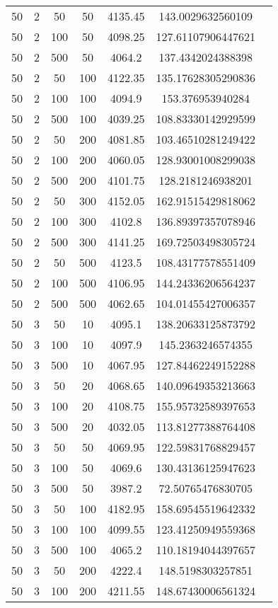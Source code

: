 {\begin{longtabu}{S
S
S
S
S
S[round-mode=places,round-precision=0]
S[round-mode=places,round-precision=0]}
50 & 2 & 50 & 50 & 4135.45 & 143.0029632560109 \\
50 & 2 & 100 & 50 & 4098.25 & 127.61107906447621 \\
50 & 2 & 500 & 50 & 4064.2 & 137.4342024388398 \\
50 & 2 & 50 & 100 & 4122.35 & 135.17628305290836 \\
50 & 2 & 100 & 100 & 4094.9 & 153.376953940284 \\
50 & 2 & 500 & 100 & 4039.25 & 108.83330142929599 \\
50 & 2 & 50 & 200 & 4081.85 & 103.46510281249422 \\
50 & 2 & 100 & 200 & 4060.05 & 128.93001008299038 \\
50 & 2 & 500 & 200 & 4101.75 & 128.2181246938201 \\
50 & 2 & 50 & 300 & 4152.05 & 162.91515429818062 \\
50 & 2 & 100 & 300 & 4102.8 & 136.89397357078946 \\
50 & 2 & 500 & 300 & 4141.25 & 169.72503498305724 \\
50 & 2 & 50 & 500 & 4123.5 & 108.43177578551409 \\
50 & 2 & 100 & 500 & 4106.95 & 144.24336206564237 \\
50 & 2 & 500 & 500 & 4062.65 & 104.01455427006357 \\
50 & 3 & 50 & 10 & 4095.1 & 138.20633125873792 \\
50 & 3 & 100 & 10 & 4097.9 & 145.2363246574355 \\
50 & 3 & 500 & 10 & 4067.95 & 127.84462249152288 \\
50 & 3 & 50 & 20 & 4068.65 & 140.09649353213663 \\
50 & 3 & 100 & 20 & 4108.75 & 155.95732589397653 \\
50 & 3 & 500 & 20 & 4032.05 & 113.81277388764408 \\
50 & 3 & 50 & 50 & 4069.95 & 122.59831768829457 \\
50 & 3 & 100 & 50 & 4069.6 & 130.43136125947623 \\
50 & 3 & 500 & 50 & 3987.2 & 72.50765476830705 \\
50 & 3 & 50 & 100 & 4182.95 & 158.69545519642332 \\
50 & 3 & 100 & 100 & 4099.55 & 123.41250949559368 \\
50 & 3 & 500 & 100 & 4065.2 & 110.18194044397657 \\
50 & 3 & 50 & 200 & 4222.4 & 148.5198303257851 \\
50 & 3 & 100 & 200 & 4211.55 & 148.67430006561324 \\

\end{longtabu}}
